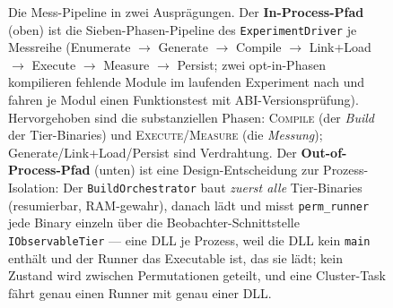 \begin{nurlang}
\begin{figure}[htbp]
\caption{Die Mess-Pipeline in zwei Ausprägungen. Der \textbf{In-Process-Pfad} (oben) ist die
Sieben-Phasen-Pipeline des \texttt{ExperimentDriver} je Messreihe (Enumerate $\to$ Generate $\to$ Compile
$\to$ Link+Load $\to$ Execute $\to$ Measure $\to$ Persist; zwei opt-in-Phasen kompilieren fehlende Module
im laufenden Experiment nach und fahren je Modul einen Funktionstest mit ABI-Versionsprüfung). Hervorgehoben sind die substanziellen
Phasen: \textsc{Compile} (der \emph{Build} der Tier-Binaries) und \textsc{Execute}/\textsc{Measure} (die
\emph{Messung}); Generate/Link+Load/Persist sind Verdrahtung. Der \textbf{Out-of-Process-Pfad} (unten) ist
eine Design-Entscheidung zur Prozess-Isolation: Der \texttt{BuildOrchestrator} baut \emph{zuerst alle}
Tier-Binaries (resumierbar, RAM-gewahr), danach lädt und misst \texttt{perm\_runner} jede Binary einzeln
über die Beobachter-Schnittstelle \texttt{IObservableTier} --- eine DLL je Prozess, weil die DLL kein
\texttt{main} enthält und der Runner das Executable ist, das sie lädt; kein Zustand wird zwischen
Permutationen geteilt, und eine Cluster-Task fährt genau einen Runner mit genau einer
DLL.}\label{fig:pipeline}
\end{figure}
\begin{figure}[htbp]\centering
\end{figure}
\end{nurlang}
